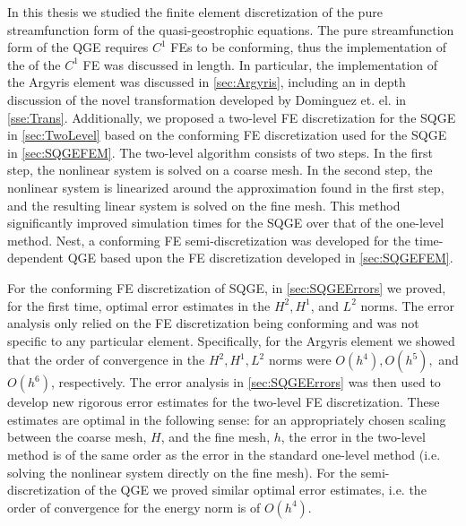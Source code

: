 In this thesis we studied the finite element discretization of the pure
streamfunction form of the quasi-geostrophic equations. The pure streamfunction
form of the QGE requires $C^1$ FEs to be conforming, thus the implementation of
the of the $C^1$ FE was discussed in length. In particular, the implementation
of the Argyris element was discussed in \autoref{sec:Argyris}, including an in
depth discussion of the novel transformation developed by Dominguez et. el.
\cite{Dominguez08} in \autoref{sse:Trans}. Additionally, we proposed a two-level
FE discretization for the SQGE in \autoref{sec:TwoLevel} based on the conforming
FE discretization used for the SQGE in \autoref{sec:SQGEFEM}. The two-level
algorithm consists of two steps. In the first step, the nonlinear system is
solved on a coarse mesh. In the second step, the nonlinear system is linearized
around the approximation found in the first step, and the resulting linear
system is solved on the fine mesh.  This method significantly improved
simulation times for the SQGE over that of the one-level method. Nest, a
conforming FE semi-discretization was developed for the time-dependent QGE based
upon the FE discretization developed in \autoref{sec:SQGEFEM}.

For the conforming FE discretization of SQGE, in \autoref{sec:SQGEErrors} we
proved, for the first time, optimal error estimates in the $H^2,H^1$, and $L^2$
norms. The error analysis only relied on the FE discretization being conforming
and was not specific to any particular element. Specifically, for the Argyris
element we showed that the order of convergence in the $H^2,H^1,L^2$ norms were
$O(h^4),O(h^5),$ and $O(h^6)$, respectively. The error analysis in
\autoref{sec:SQGEErrors} was then used to develop new rigorous error estimates
for the two-level FE discretization. These estimates are optimal in the
following sense: for an appropriately chosen scaling between the coarse mesh,
$H$, and the fine mesh, $h$, the error in the two-level method is of the same
order as the error in the standard one-level method (i.e. solving the nonlinear
system directly on the fine mesh). For the semi-discretization of the QGE we
proved similar optimal error estimates, i.e. the order of convergence for the
energy norm is of $O(h^4)$.


